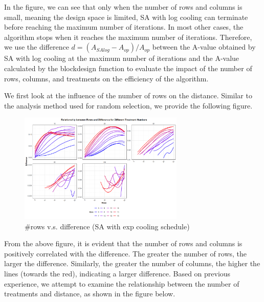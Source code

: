 \documentclass[
  a4paper,
  oneside,
  openany,
  12pt,
  onecolumn]{book}
\theoremstyle{definition}
\theoremstyle{plain}
\theoremstyle{remark}
\begin{document}
In the figure, we can see that only when the number of rows and columns
is small, meaning the design space is limited, SA with log cooling can
terminate before reaching the maximum number of iterations. In most
other cases, the algorithm stops when it reaches the maximum number of
iterations. Therefore, we use the difference
\(d = (A_{SAlog}-A_{op})/A_{op}\) between the A-value obtained by SA
with log cooling at the maximum number of iterations and the A-value
calculated by the blockdesign function to evaluate the impact of the
number of rows, columns, and treatments on the efficiency of the
algorithm.

We first look at the influence of the number of rows on the distance.
Similar to the analysis method used for random selection, we provide the
following figure.

\begin{figure}[H]

{\centering \includegraphics[width=0.7\textwidth,height=\textheight]{images/Rplots/SA-Slow-eva/SA-Slow-row-vs-diff.png}

}

\caption{\#rows v.s. difference (SA with exp cooling schedule)}

\end{figure}%

From the above figure, it is evident that the number of rows and columns
is positively correlated with the difference. The greater the number of
rows, the larger the difference. Similarly, the greater the number of
columns, the higher the lines (towards the red), indicating a larger
difference. Based on previous experience, we attempt to examine the
relationship between the number of treatments and distance, as shown in
the figure below.
\end{document}
